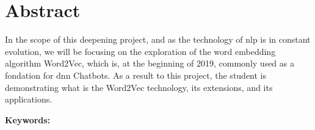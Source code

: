 \chapter*{Abstract}

In the scope of this deepening project, and as the technology of \acrshort{nlp} is in constant evolution, we will be focusing on the exploration of the word embedding algorithm Word2Vec, which is, at the beginning of 2019, commonly used as a fondation for \acrshort{dnn} Chatbots. As a result to this project, the student is demonstrating what is the Word2Vec technology, its extensions, and its applications.

\vskip0.5cm
\textbf{Keywords:} 
\Keywords